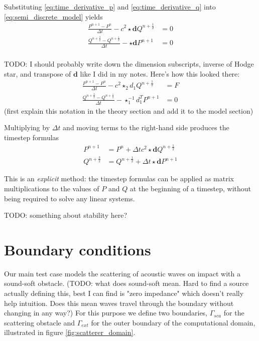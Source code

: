 \documentclass[utf8,english]{gradu3}
\begin{document}
Substituting \eqref{eq:time_derivative_p} and \eqref{eq:time_derivative_q}
into \eqref{eq:semi_discrete_model} yields
\begin{align*}
\frac{P^{n+1} - P^n}{\Delta t} - c^2 \star \mathbf{d} Q^{n+\frac{1}{2}} &= 0 \\
\frac{Q^{n+\frac{3}{2}} - Q^{n+\frac{1}{2}}}{\Delta t}
- \star \mathbf{d} P^{n+1} &= 0 \\
\end{align*}

TODO: I should probably write down the dimension subscripts,
inverse of Hodge star, and transpose of $\mathbf{d}$ like I did in my notes.
Here's how this looked there:
\begin{align*}
  \frac{P^{n+1} - P^n}{\Delta t} - c^2 \star_2 d_1 Q^{n+\frac{1}{2}} &= F \\
  \frac{Q^{n+\frac{3}{2}} - Q^{n+\frac{1}{2}}}{\Delta t}
  - \star_1^{-1} d_1^T P^{n+1} &= 0
\end{align*}
(first explain this notation in the theory section
and add it to the model section)

Multiplying by $\Delta t$ and moving terms to the right-hand side
produces the timestep formulas
\begin{align}
  \label{eq:timestep_p}
  P^{n+1} &= P^n + \Delta t c^2 \star \mathbf{d} Q^{n+\frac{1}{2}} \\
  \label{eq:timestep_q}
  Q^{n+\frac{3}{2}} &= Q^{n+\frac{1}{2}} + \Delta t \star \mathbf{d} P^{n+1}
\end{align}

This is an \textit{explicit} method:
the timestep formulas can be applied as matrix multiplications
to the values of $P$ and $Q$ at the beginning of a timestep,
without being required to solve any linear systems.

TODO: something about stability here?

\section{Boundary conditions}\label{sec:boundary_conditions}

Our main test case models the scattering of acoustic waves
on impact with a sound-soft obstacle.
(TODO: what does sound-soft mean. Hard to find a source actually defining this,
best I can find is "zero impedance" which doesn't really help intuition.
Does this mean waves travel through the boundary without changing in any way?)
For this purpose we define two boundaries,
$\Gamma_{sca}$ for the scattering obstacle
and $\Gamma_{ext}$ for the outer boundary of the computational domain,
illustrated in figure \ref{fig:scatterer_domain}.
\end{document}
